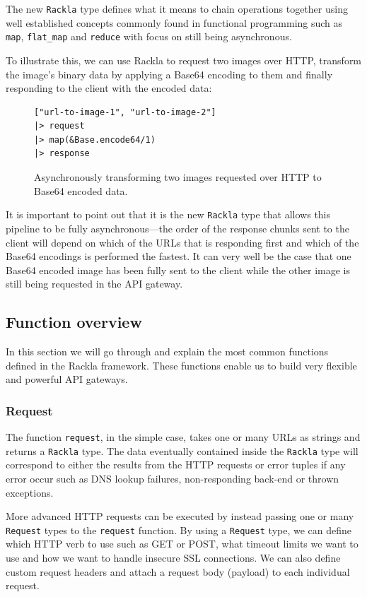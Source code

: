 \documentclass{cslthse-msc}
\begin{document}
The new \lstinline{Rackla} type defines what it means to chain operations together using well established concepts commonly found in functional programming such as \lstinline{map}, \lstinline{flat_map} and \lstinline{reduce} with focus on still being asynchronous.

To illustrate this, we can use Rackla to request two images over HTTP, transform the image's binary data by applying a Base64 encoding to them and finally responding to the client with the encoded data:

\begin{figure}[H]
  \centering
\begin{lstlisting}[breaklines=true,frame=single]
["url-to-image-1", "url-to-image-2"]
|> request
|> map(&Base.encode64/1)
|> response
\end{lstlisting}
  \caption{Asynchronously transforming two images requested over HTTP to Base64 encoded data.}
    \label{fig:map}
\end{figure}

It is important to point out that it is the new \lstinline{Rackla} type that allows this pipeline to be fully asynchronous---the order of the response chunks sent to the client will depend on which of the URLs that is responding first and which of the Base64 encodings is performed the fastest. It can very well be the case that one Base64 encoded image has been fully sent to the client while the other image is still being requested in the API gateway.

\subsection{Function overview}
In this section we will go through and explain the most common functions defined in the Rackla framework. These functions enable us to build very flexible and powerful API gateways.

\subsubsection{Request}
The function \lstinline{request}, in the simple case, takes one or many URLs as strings and returns a \lstinline{Rackla} type. The data eventually contained inside the \lstinline{Rackla} type will correspond to either the results from the HTTP requests or error tuples if any error occur such as DNS lookup failures, non-responding back-end or thrown exceptions.

More advanced HTTP requests can be executed by instead passing one or many \lstinline{Request} types to the \lstinline{request} function. By using a \lstinline{Request} type, we can define which HTTP verb to use such as GET or POST, what timeout limits we want to use and how we want to handle insecure SSL connections. We can also define custom request headers and attach a request body (payload) to each individual request.
\end{document}
